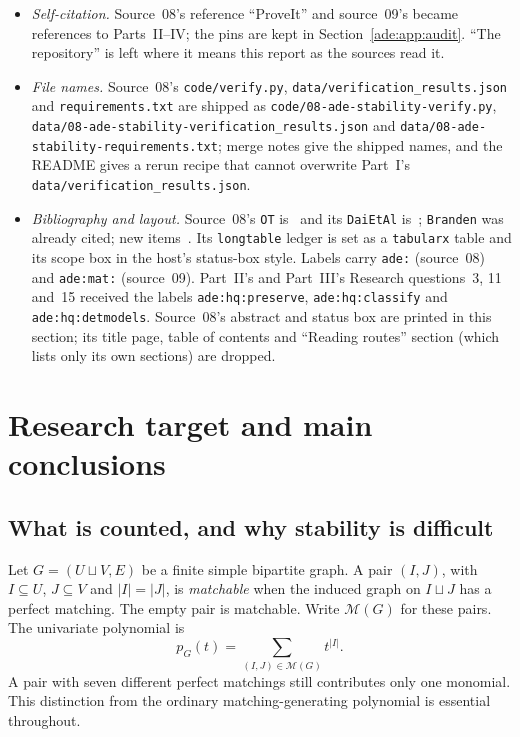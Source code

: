 \documentclass[11pt]{article}
\numberwithin{equation}{section}
\theoremstyle{definition}
\newcommand{\PM}{\mathcal M}
\begin{document}
\begin{itemize}[leftmargin=1.4em]
and source~09's first ask the same and are printed once with both
formulations.
\item \emph{Self-citation.} Source~08's reference ``ProveIt'' and source~09's
became references to Parts~II--IV; the pins are kept in
Section~\ref{ade:app:audit}. ``The repository'' is left where it means this
report as the sources read it.
\item \emph{File names.} Source~08's \nolinkurl{code/verify.py},
\nolinkurl{data/verification_results.json} and \nolinkurl{requirements.txt}
are shipped as \nolinkurl{code/08-ade-stability-verify.py},
\nolinkurl{data/08-ade-stability-verification_results.json} and
\nolinkurl{data/08-ade-stability-requirements.txt}; merge notes give the
shipped names, and the README gives a rerun recipe that cannot overwrite
Part~I's \nolinkurl{data/verification_results.json}.
\item \emph{Bibliography and layout.} Source~08's \texttt{OT} is~\cite{OT21}
and its \texttt{DaiEtAl} is~\cite{DHLTW}; \texttt{Branden} was already cited;
new items~\cite{COSW,McKeeSmyth}. Its \texttt{longtable} ledger is set as a
\texttt{tabularx} table and its scope box in the host's status-box style.
Labels carry \texttt{ade:} (source~08) and \texttt{ade:mat:} (source~09).
Part~II's and Part~III's Research questions~3, 11 and~15 received the labels
\texttt{ade:hq:preserve}, \texttt{ade:hq:classify} and \texttt{ade:hq:detmodels}.
Source~08's abstract and status box are printed in this section; its title
page, table of contents and ``Reading routes'' section (which lists only its
own sections) are dropped.
\end{itemize}

\section{Research target and main conclusions}
\label{ade:sec:intro}

\subsection{What is counted, and why stability is difficult}

Let $G=(U\sqcup V,E)$ be a finite simple bipartite graph.  A pair
$(I,J)$, with $I\subseteq U$, $J\subseteq V$ and $|I|=|J|$, is
\emph{matchable} when the induced graph on $I\sqcup J$ has a perfect
matching.  The empty pair is matchable.  Write $\PM(G)$ for these pairs.
The univariate polynomial is
\begin{equation}
 p_G(t)=\sum_{(I,J)\in\PM(G)}t^{|I|}.
 \label{ade:eq:pdef}
\end{equation}
A pair with seven different perfect matchings still contributes only one
monomial.  This distinction from the ordinary matching-generating
polynomial is essential throughout.
\end{document}

